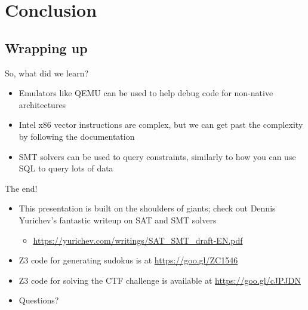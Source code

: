 
\section{Conclusion}

\subsection{Wrapping up}

\begin{frame}{So, what did we learn?}
    \begin{itemize}
        \item<1-> Emulators like QEMU can be used to help debug code for
                  non-native architectures
        \item<2-> Intel x86 vector instructions are complex, but we can get
                  past the complexity by following the documentation
        \item<3-> SMT solvers can be used to query constraints,
                  similarly to how you can use SQL to query lots of data
    \end{itemize}
\end{frame}

\begin{frame}{The end!}
    \begin{itemize}
        \item This presentation is built on the shoulders of giants; check out
              Dennis Yurichev's fantastic writeup on SAT and SMT solvers
        \begin{itemize}
            \item \url{https://yurichev.com/writings/SAT_SMT_draft-EN.pdf}
        \end{itemize}
        \item Z3 code for generating sudokus is at \url{https://goo.gl/ZC1546}
        \item Z3 code for solving the CTF challenge is available at
              \url{https://goo.gl/cJPJDN}
        \item Questions?
    \end{itemize}
\end{frame}
